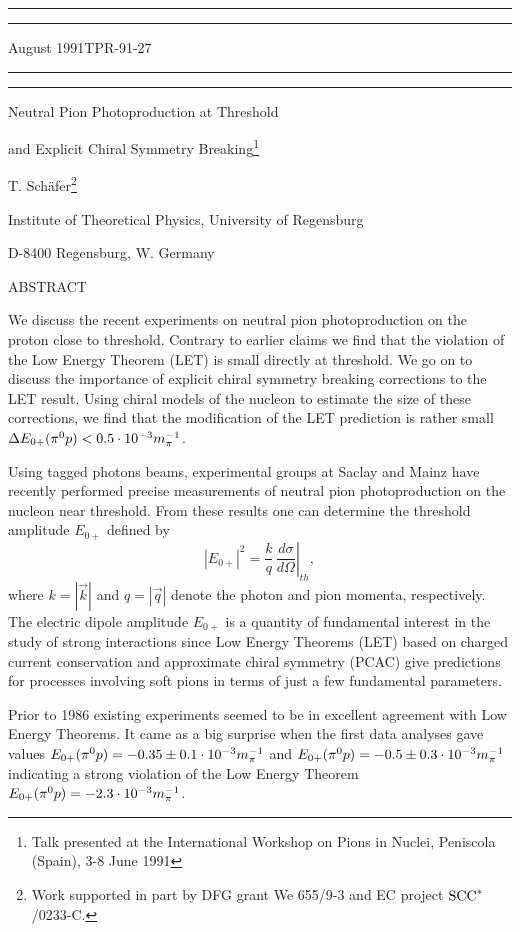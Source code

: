 \hrule width 15.0 cm  \vskip1pt \hrule width 15.0 cm height1pt
\vskip3pt
August 1991\hfill{TPR-91-27}
\vskip3pt\hrule  width 15.0 cm height1pt  \vskip1pt  \hrule width 15.0 cm 
\vskip 2.5cm 
%
\renewcommand{\thefootnote}{\fnsymbol{footnote}} 
\centerline{\LARGE Neutral Pion Photoproduction at Threshold} 
\vskip12pt
\centerline{\LARGE and Explicit Chiral Symmetry Breaking\footnote{Talk
presented at the International Workshop on Pions in Nuclei, Peniscola
(Spain), 3-8 June 1991}}
\vskip1.5cm
\centerline{T. Sch\"afer\footnote{Work supported in part by
 DFG grant We 655/9-3 and EC project ${\rm SCC}^{*}$/0233-C.}}
\centerline{ Institute of Theoretical Physics, 
         University of Regensburg}
\centerline{  D-8400 Regensburg, W. Germany}
\vskip4.5cm  
\centerline{ABSTRACT}
\begin{center}
\begin{minipage}[t]{12.7cm}
{\footnotesize
We discuss the recent experiments on neutral
pion photoproduction on the proton close to threshold. Contrary to
earlier claims we find that the violation of the Low Energy Theorem
(LET) is small directly at threshold. We go on to discuss the 
importance of explicit chiral symmetry breaking corrections to the
LET result. Using chiral models of the nucleon to estimate
the size of these corrections, we find that the modification of the
LET prediction is rather small $\Delta E_{0+}(\pi^0p)<0.5\cdot 10^{-3} m_\pi^{-1}$.}
\end{minipage}
\end{center}
\vskip1cm
\setcounter{footnote}{0}
\renewcommand{\thefootnote}{\arabic{footnote}}
\newpage
{}
Using tagged photons beams, experimental groups at Saclay \cite{Maz86} and
Mainz \cite{Bec89,Bec90} have recently performed precise measurements of 
neutral pion photoproduction on the nucleon near threshold. From these 
results one can determine the threshold amplitude $E_{0+}$ defined by
\begin{equation}
|E_{0+}|^2 =
\left. \frac{k}{q}\, 
\frac{d \sigma}{d \Omega}
 \right|_{th}  ,
\end{equation}
where $k=|\vec{k}|$ and $q=|\vec{q}|$ denote the photon and pion momenta, 
respectively. The electric dipole amplitude $E_{0+}$ is a quantity of 
fundamental interest in the study of strong interactions since  Low Energy
Theorems (LET) based on charged current conservation and approximate chiral
symmetry (PCAC) give predictions for processes involving soft pions in terms
of just a few fundamental parameters.

Prior to 1986 existing experiments seemed to be in excellent agreement with 
Low Energy Theorems. It came as a big surprise when the first
data analyses gave values \cite{Maz86,Bec89} $E_{0+}(\pi^0 p)=-0.35\pm 0.1 \cdot 10^{-3} m_\pi^{-1}$ and
$E_{0+}(\pi^0 p)=-0.5\pm 0.3\cdot 10^{-3} m_\pi^{-1}$ indicating a strong violation of the 
Low Energy Theorem 
$
E_{0+}(\pi^0 p) = -2.3 \cdot 10^{-3} m_\pi^{-1} 
$.

